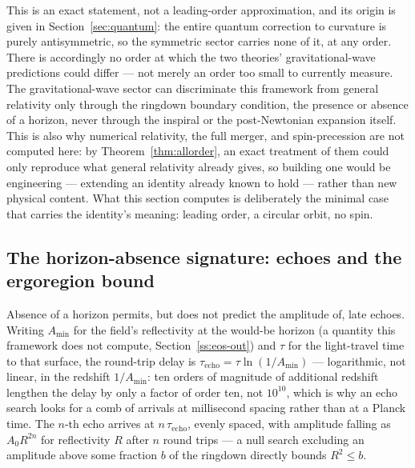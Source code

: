 \documentclass[pdflatex,sn-mathphys-num]{sn-jnl}
\theoremstyle{thmstyleone}
\theoremstyle{thmstylethree}
\theoremstyle{thmstyletwo}
\begin{document}
This is an exact statement, not a leading-order approximation, and its
origin is given in Section~\ref{sec:quantum}: the entire quantum
correction to curvature is purely antisymmetric, so the symmetric sector
carries none of it, at any order. There is accordingly no order at which
the two theories' gravitational-wave predictions could differ — not
merely an order too small to currently measure. The gravitational-wave
sector can discriminate this framework from general relativity only
through the ringdown boundary condition, the presence or absence of a
horizon, never through the inspiral or the post-Newtonian expansion
itself. This is also why numerical relativity, the full merger, and
spin-precession are not computed here: by Theorem~\ref{thm:allorder}, an
exact treatment of them could only reproduce what general relativity
already gives, so building one would be engineering — extending an
identity already known to hold — rather than new physical content. What
this section computes is deliberately the minimal case that carries the
identity's meaning: leading order, a circular orbit, no spin.

\subsection{The horizon-absence signature: echoes and the ergoregion bound}\label{ss:echo}

Absence of a horizon permits, but does not predict the amplitude of, late
echoes. Writing $A_{\min}$ for the field's reflectivity at the would-be
horizon (a quantity this framework does not compute, Section~\ref{ss:eos-out})
and $\tau$ for the light-travel time to that surface, the round-trip
delay is $\tau_{\text{echo}}=\tau\ln(1/A_{\min})$ — logarithmic, not
linear, in the redshift $1/A_{\min}$: ten orders of magnitude of
additional redshift lengthen the delay by only a factor of order ten, not
$10^{10}$, which is why an echo search looks for a comb of arrivals at
millisecond spacing rather than at a Planck time. The $n$-th echo arrives
at $n\,\tau_{\text{echo}}$, evenly spaced, with amplitude falling as
$A_0 R^{2n}$ for reflectivity $R$ after $n$ round trips — a null search
excluding an amplitude above some fraction $b$ of the ringdown directly
bounds $R^2 \leq b$.
\end{document}
